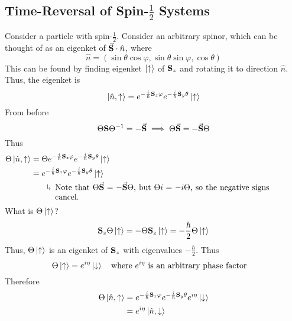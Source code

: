 \documentclass[12pt,a4paper,titlepage]{article}
\newcommand{\up}{\uparrow} %
\newcommand{\dn}{\downarrow} %
\newcommand{\explain}[1]{%
	\quad\rotatebox[origin=c]{180}{\enskip$\Lsh$}\hfill
	\begin{minipage}[t]{\dimexpr\linewidth-8em\relax}
	#1
	\end{minipage}\hspace{4em}\bigskip
}
\begin{document}
\subsection{Time-Reversal of Spin-$\frac{1}{2}$ Systems}
Consider a particle with spin-$\frac{1}{2}$. Consider an arbitrary spinor, which can be thought of as an eigenket of $\vec{\vb{S}}\cdot\hat{n}$, where
\begin{equation}
\hat{n}=(\sin\theta\cos\varphi,\sin\theta\sin\varphi,\cos\theta)
\end{equation}
This can be found by finding eigenket $\ket{\up}$ of $\vb{S}_{z}$ and rotating it to direction $\hat{n}$. Thus, the eigenket is
\begin{equation}
\ket{\hat{n},\up}=e^{-\frac{i}{\hbar}\vb{S}_{z}\varphi}e^{-\frac{i}{\hbar}\vb{S}_{y}\theta}\ket{\up}
\end{equation}
From before
\begin{equation}
\Theta\vb{S}\Theta^{-1}=-\vec{\vb{S}}\implies \Theta\vec{\vb{S}}=-\vec{\vb{S}}\Theta
\end{equation}
Thus
\begin{equation}
\begin{aligned}
\Theta\ket{\hat{n},\up}&=\Theta e^{-\frac{i}{\hbar}\vb{S}_{z}\varphi}e^{-\frac{i}{\hbar}\vb{S}_{y}\theta}\ket{\up}\\
&=e^{-\frac{i}{\hbar}\vb{S}_{z}\varphi}e^{-\frac{i}{\hbar}\vb{S}_{y}\theta}\ket{\up}\\
&\quad\explain{Note that $\Theta\vec{\vb{S}}=-\vec{\vb{S}}\Theta$, but $\Theta i=-i\Theta$, so the negative signs cancel.}
\end{aligned}
\end{equation}
What is $\Theta\ket{\up}$?
\begin{equation}
\vb{S}_{z}\Theta\ket{\up}=-\Theta\vb{S}_{z}\ket{\up}=-\frac{\hbar}{2}\Theta\ket{\up}
\end{equation}
Thus, $\Theta\ket{\up}$ is an eigenket of $\vb{S}_{z}$ with eigenvalues $-\frac{\hbar}{2}$. Thus
\begin{equation}
\Theta\ket{\up}=e^{i\eta}\ket{\dn}\qq{where $e^{i\eta}$ is an arbitrary phase factor}
\end{equation}
Therefore
\begin{equation}
\begin{aligned}
\Theta\ket{\hat{n},\up}&=e^{-\frac{i}{\hbar}\vb{S}_{z}\varphi}e^{-\frac{i}{\hbar}\vb{S}_{y}\theta}e^{i\eta}\ket{\dn}\\
&=e^{i\eta}\ket{\hat{n},\dn}
\end{aligned}
\end{equation}
\end{document}
